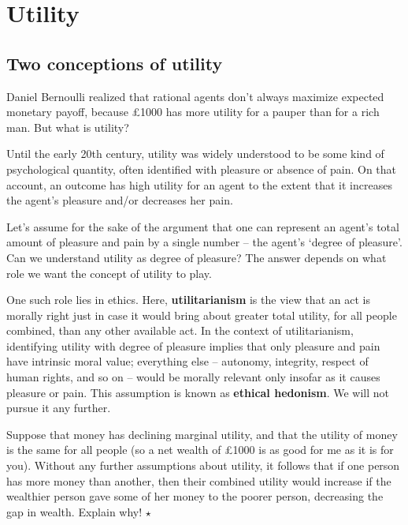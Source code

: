 \chapter{Utility}\label{ch:utility}



\section{Two conceptions of utility}

Daniel Bernoulli realized that rational agents don't always maximize
expected monetary payoff, because £1000 has more utility for a pauper
than for a rich man. But what is utility?

Until the early 20th century, utility was widely understood to be some
kind of psychological quantity, often identified with pleasure or absence
of pain. On that account, an outcome has high utility for an agent to
the extent that it increases the agent's pleasure and/or decreases her
pain.

Let's assume for the sake of the argument that one can represent an
agent's total amount of pleasure and pain by a single number -- the
agent's `degree of pleasure'. Can we understand utility as degree of
pleasure? The answer depends on what role we want the concept of
utility to play.

One such role lies in ethics. Here, \textbf{utilitarianism} is the
view that an act is morally right just in case it would bring about
greater total utility, for all people combined, than any other
available act. In the context of utilitarianism, identifying utility
with degree of pleasure implies that only pleasure and pain have
intrinsic moral value; everything else -- autonomy, integrity, respect
of human rights, and so on -- would be morally relevant only insofar
as it causes pleasure or pain. This assumption is known as \textbf{ethical
  hedonism}. We will not pursue it any further.

\begin{exercise}
  Suppose that money has declining marginal utility, and that the
  utility of money is the same for all people (so a net wealth of
  £1000 is as good for me as it is for you). Without any further
  assumptions about utility, it follows that if one person has more
  money than another, then their combined utility would increase if
  the wealthier person gave some of her money to the poorer person,
  decreasing the gap in wealth. Explain why! $\star$
\end{exercise}

